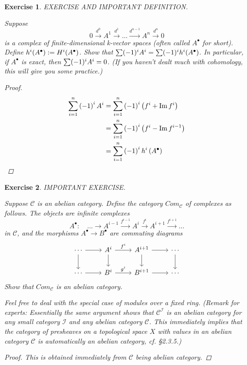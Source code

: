 \documentclass{article}
\theoremstyle{breakstyle}
\newtheorem{exercise}{Exercise}[section]
\let\ker\relax
\DeclareMathOperator{\ker}{Ker}
\DeclareMathOperator{\im}{Im}
\let\dim\relax
\DeclareMathOperator{\dim}{Dim}
\begin{document}
\begin{exercise}
EXERCISE AND IMPORTANT DEFINITION.

Suppose
$$
0 \xrightarrow{d^{0}} A^{1} \xrightarrow{d^{1}} \dots \xrightarrow{d^{n-1}}
A^{n} \xrightarrow{d^{n}} 0
$$
is a complex of finite-dimensional k-vector spaces (often called
$A^{\bullet}$ for short). Define $h^i(A^{\bullet}) := \dim H^i(A^{\bullet})$.
Show that $\sum (-1)^i \dim A^i = \sum (-1)^i h^i(A^{\bullet})$. In
particular, if $A^{\bullet}$ is exact, then $\sum (-1)^i \dim A^i = 0$. (If
you haven't dealt much with cohomology, this will give you some practice.)

\begin{proof}
    \begin{align*}
        \sum_{i=1}^{n} \left( -1 \right) ^{i}\dim{A^{i}}
        &= \sum_{i=1}^{n} \left( -1 \right)^{i}\left(
        \dim{\ker{f^{i}}}+\dim{\im{f^{i}}} \right)    \\
        &= \sum_{i=1}^{n} \left( -1 \right) ^{i}\left(
        \dim{\ker{f^{i}}}-\dim{\im{f^{i-1}}} \right) \\
        &= \sum_{i=1}^{n} \left( -1 \right) ^{i}h^{i}\left( A^{\bullet } \right)
    \end{align*}
\end{proof}

\end{exercise}

\begin{exercise}
IMPORTANT EXERCISE.

Suppose $\mathcal{C}$ is an abelian category. Define the category
$Com_{\mathcal{C}}$ of complexes as follows. The objects are infinite
complexes
$$
A^{\bullet}: \quad \dots \longrightarrow A^{i-1} \xrightarrow{f^{i-1}}
A^{i} \xrightarrow{f^{i}} A^{i+1} \xrightarrow{f^{i+1}} \dots
$$
in $\mathcal{C}$, and the morphisms $A^{\bullet} \to B^{\bullet}$ are
commuting diagrams
$$
\begin{tikzcd}
    \cdots \arrow[r] \arrow[d] & A^{i} \arrow[r, "f^{i}"] \arrow[d] & A^{i+1} \arrow[r] \arrow[d] & \cdots \arrow[d] \\
    \cdots \arrow[r] & B^{i} \arrow[r, "g^{i}"] & B^{i+1} \arrow[r] & \cdots
\end{tikzcd}
$$
Show that $Com_{\mathcal{C}}$ is an abelian category.

Feel free to deal with the special case of modules over a fixed ring.
(Remark for experts: Essentially the same argument shows that
$\mathcal{C}^{\mathcal{I}}$ is an abelian category for any small category
$\mathcal{I}$ and any abelian category $\mathcal{C}$. This immediately
implies that the category of presheaves on a topological space $X$ with
values in an abelian category $\mathcal{C}$ is automatically an abelian
category, cf. \S\emph{2.3.5}.)

\begin{proof}
    This is obtained immediately from $\mathscr{C}$ being abelian category.
\end{proof}

\end{exercise}
\end{document}
